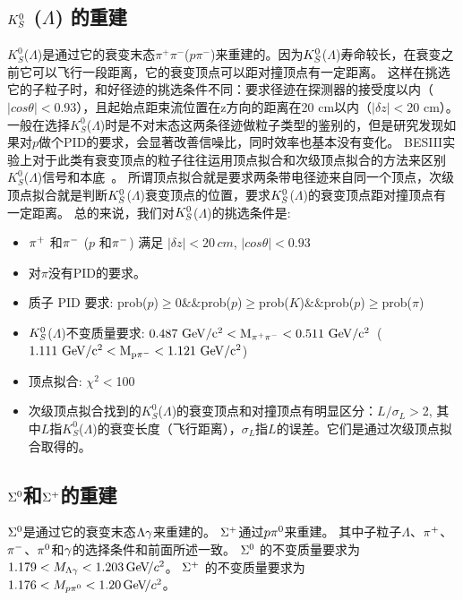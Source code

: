 \subsection{$K_{S}^0$ ($\Lambda$) 的重建}
$K_{S}^{0}$($\Lambda$)是通过它的衰变末态$\pi^{+}\pi^{-}$($p\pi^{-}$)来重建的。因为$K_{S}^0$($\Lambda$)寿命较长，在衰变之前它可以飞行一段距离，它的衰变顶点可以距对撞顶点有一定距离。
这样在挑选它的子粒子时，和好径迹的挑选条件不同：要求径迹在探测器的接受度以内（$|cos\theta|<$\rm0.93），且起始点距束流位置在z方向的距离在20 cm以内（$|\delta z|<$20 cm）。
一般在选择$K_{S}^{0}$($\Lambda$)时是不对末态这两条径迹做粒子类型的鉴别的，但是研究发现如果对$p$做个PID的要求，会显著改善信噪比，同时效率也基本没有变化。
BESIII实验上对于此类有衰变顶点的粒子往往运用顶点拟合和次级顶点拟合的方法来区别$K_{S}^{0}$($\Lambda$)信号和本底~\cite{vfit}。
所谓顶点拟合就是要求两条带电径迹来自同一个顶点，次级顶点拟合就是判断$K_{S}^0$($\Lambda$)衰变顶点的位置，要求$K_{S}^0$($\Lambda$)的衰变顶点距对撞顶点有一定距离。
总的来说，我们对$K_{S}^0$($\Lambda$)的挑选条件是:
\begin{itemize}
  \item ${{\pi}^+}$ 和${{\pi}^-}$ ($p$ 和${{\pi}^-}$) 满足 $|\delta z|<20\,\unit{cm}$, $|cos\theta|<0.93$
  \item 对$\pi$没有PID的要求。
  \item 质子 PID 要求:  prob($p$)$\geqslant$0$\&\&$prob($p$)$\geqslant$prob($K$)$\mathcal{\&\&}$prob($p$)$\geqslant$prob($\pi$)
  \item $K_{S}^0$($\Lambda$)不变质量要求: $0.487\rm \ GeV/c^{2}<M_{{{\pi}^+}{{\pi}^-}}<\rm 0.511\rm \ GeV/c^{2}$~($1.111\rm \ GeV/c^{2}<M_{p\pim}<\rm 1.121\rm \ GeV/c^{2}$)
  \item 顶点拟合: $\chi^{2}<$100
  \item 次级顶点拟合找到的$K_{S}^{0}$($\Lambda$)的衰变顶点和对撞顶点有明显区分：$L/\sigma_{L}>$2, 其中$L$指$K_{S}^{0}$($\Lambda$)的衰变长度（飞行距离），$\sigma_{L}$指$L$的误差。它们是通过次级顶点拟合取得的。
\end{itemize}

\subsection{$\Sigma^0$和$\Sigma^+$的重建}
$\Sigma^0$是通过它的衰变末态$\Lambda\gamma$来重建的。
$\Sigma^+$通过$p \pi^0$来重建。
其中子粒子$\Lambda$、${{\pi}^+}$、${{\pi}^-}$、$\pi^0$和$\gamma$的选择条件和前面所述一致。
$\Sigma^0$ 的不变质量要求为$1.179<M_{\Lambda\gamma}<1.203{\mathrm{\,Ge\kern -0.1em V\!/}c^2}$。
$\Sigma^+$ 的不变质量要求为$1.176<M_{p \pi^0}<1.20{\mathrm{\,Ge\kern -0.1em V\!/}c^2}$。

